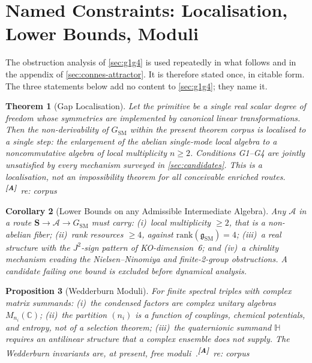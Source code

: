 \documentclass[12pt,a4paper,twoside]{article}
\theoremstyle{plain}
\newtheorem{theorem}{Theorem}[section]
\newtheorem{proposition}[theorem]{Proposition}
\newtheorem{corollary}[theorem]{Corollary}
\theoremstyle{definition}
\theoremstyle{remark}
\newcommand{\catmark}[1]{\textsuperscript{\textsf{\textbf{[#1]}}}}
\begin{document}
\section{Named Constraints: Localisation, Lower Bounds, Moduli}
\label{sec:named-constraints}

\noindent The obstruction analysis of \cref{sec:g1g4} is used repeatedly
in what follows and in the appendix of \cref{sec:connes-attractor}. It is
therefore stated once, in citable form. The three statements below add no
content to \cref{sec:g1g4}; they name it.

\begin{theorem}[Gap Localisation]
\label{thm:gap-localisation}
Let the primitive be a single real scalar degree of freedom whose
symmetries are implemented by canonical linear transformations. Then the
non-derivability of $G_{\mathrm{SM}}$ within the present theorem corpus
is localised to a single step: the enlargement of the abelian
single-mode local algebra to a noncommutative algebra of local
multiplicity $n \geq 2$. Conditions G1--G4 are jointly unsatisfied by
every mechanism surveyed in \cref{sec:candidates}. This is a
localisation, not an impossibility theorem for all conceivable enriched
routes.\catmark{A}\ \emph{re: corpus}
\end{theorem}

\begin{corollary}[Lower Bounds on any Admissible Intermediate Algebra]
\label{cor:algebra-lower-bounds}
Any $\mathcal A$ in a route $\mathbf S \to \mathcal A \to
G_{\mathrm{SM}}$ must carry: (i)~local multiplicity $\geq 2$, that is a
non-abelian fiber; (ii)~rank resources $\geq 4$, against
$\mathrm{rank}(\mathfrak g_{\mathrm{SM}}) = 4$; (iii)~a real structure
with the $J^2$-sign pattern of KO-dimension~6; and (iv)~a chirality
mechanism evading the Nielsen--Ninomiya and finite-2-group obstructions.
A candidate failing one bound is excluded before dynamical analysis.
\end{corollary}

\begin{proposition}[Wedderburn Moduli]
\label{prop:wedderburn-moduli}
For finite spectral triples with complex matrix summands: (i)~the
condensed factors are complex unitary algebras $M_{n_i}(\mathbb C)$;
(ii)~the partition $(n_i)$ is a function of couplings, chemical
potentials, and entropy, not of a selection theorem; (iii)~the
quaternionic summand $\mathbb H$ requires an antilinear structure that a
complex ensemble does not supply. The Wedderburn invariants are, at
present, free moduli~\cite{cacic2011}.\catmark{A}\ \emph{re: corpus}
\end{proposition}
\end{document}
